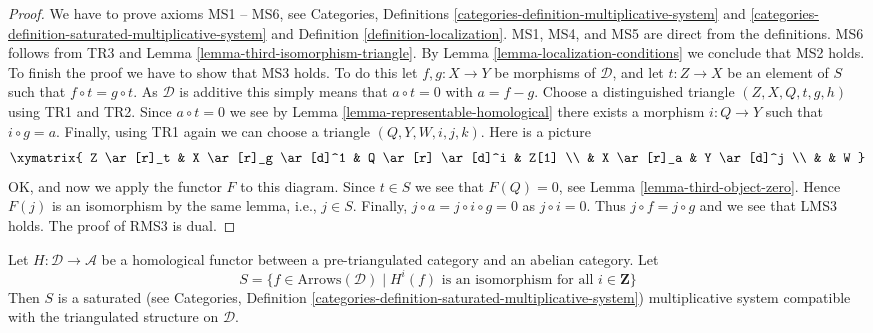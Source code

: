 \begin{proof}
We have to prove axioms MS1 -- MS6, see
Categories, Definitions \ref{categories-definition-multiplicative-system} and
\ref{categories-definition-saturated-multiplicative-system}
and
Definition \ref{definition-localization}.
MS1, MS4, and MS5 are direct from the definitions. MS6 follows from TR3 and
Lemma \ref{lemma-third-isomorphism-triangle}.
By
Lemma \ref{lemma-localization-conditions}
we conclude that MS2 holds. To finish the proof we have to show that
MS3 holds. To do this let $f, g : X \to Y$ be morphisms of $\mathcal{D}$,
and let $t : Z \to X$ be an element of $S$ such that $f \circ t = g \circ t$.
As $\mathcal{D}$ is additive this simply means that $a \circ t = 0$ with
$a = f - g$. Choose a distinguished triangle $(Z, X, Q, t, g, h)$ using
TR1 and TR2. Since $a \circ t = 0$ we see by
Lemma \ref{lemma-representable-homological}
there exists a morphism $i : Q \to Y$ such that $i \circ g = a$.
Finally, using TR1 again we can choose a triangle
$(Q, Y, W, i, j, k)$. Here is a picture
$$
\xymatrix{
Z \ar[r]_t & X \ar[r]_g \ar[d]^1 & Q \ar[r] \ar[d]^i & Z[1] \\
& X \ar[r]_a & Y \ar[d]^j \\
& & W
}
$$
OK, and now we apply the functor $F$ to this diagram.
Since $t \in S$ we see that $F(Q) = 0$, see
Lemma \ref{lemma-third-object-zero}.
Hence $F(j)$ is an isomorphism by the same lemma, i.e., $j \in S$.
Finally, $j \circ a = j \circ i \circ g = 0$ as $j \circ i = 0$.
Thus $j \circ f = j \circ g$ and we see that LMS3 holds.
The proof of RMS3 is dual.
\end{proof}

\begin{lemma}
\label{lemma-homological-functor-localize}
Let $H : \mathcal{D} \to \mathcal{A}$ be a homological functor between a
pre-triangulated category and an abelian category. Let
$$
S = \{f \in \text{Arrows}(\mathcal{D})
\mid H^i(f)\text{ is an isomorphism for all }i \in \mathbf{Z}\}
$$
Then $S$ is a saturated (see
Categories,
Definition \ref{categories-definition-saturated-multiplicative-system})
multiplicative system compatible with the
triangulated structure on $\mathcal{D}$.
\end{lemma}

